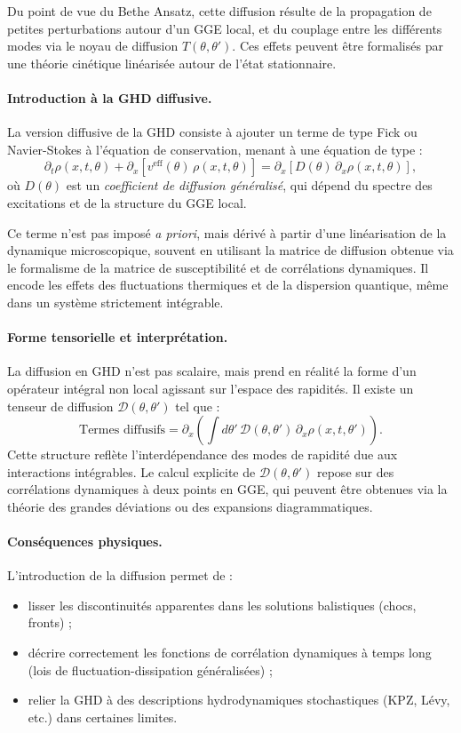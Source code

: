 Du point de vue du Bethe Ansatz, cette diffusion résulte de la propagation de petites perturbations autour d’un GGE local, et du couplage entre les différents modes via le noyau de diffusion $T(\theta,\theta')$. Ces effets peuvent être formalisés par une théorie cinétique linéarisée autour de l’état stationnaire.

\paragraph{Introduction à la GHD diffusive.}
La version diffusive de la GHD consiste à ajouter un terme de type Fick ou Navier-Stokes à l’équation de conservation, menant à une équation de type :
\[
\partial_t \rho(x,t,\theta) + \partial_x \left[ v^{\mathrm{eff}}(\theta)\, \rho(x,t,\theta) \right]
= \partial_x \left[ D(\theta)\, \partial_x \rho(x,t,\theta) \right],
\]
où $D(\theta)$ est un \emph{coefficient de diffusion généralisé}, qui dépend du spectre des excitations et de la structure du GGE local.

Ce terme n’est pas imposé \emph{a priori}, mais dérivé à partir d’une linéarisation de la dynamique microscopique, souvent en utilisant la matrice de diffusion obtenue via le formalisme de la matrice de susceptibilité et de corrélations dynamiques. Il encode les effets des fluctuations thermiques et de la dispersion quantique, même dans un système strictement intégrable.

\paragraph{Forme tensorielle et interprétation.}
La diffusion en GHD n’est pas scalaire, mais prend en réalité la forme d’un opérateur intégral non local agissant sur l’espace des rapidités. Il existe un tenseur de diffusion $\mathcal{D}(\theta,\theta')$ tel que :
\[
\text{Termes diffusifs} = \partial_x \left( \int d\theta'\, \mathcal{D}(\theta,\theta')\, \partial_x \rho(x,t,\theta') \right).
\]
Cette structure reflète l’interdépendance des modes de rapidité due aux interactions intégrables. Le calcul explicite de $\mathcal{D}(\theta,\theta')$ repose sur des corrélations dynamiques à deux points en GGE, qui peuvent être obtenues via la théorie des grandes déviations ou des expansions diagrammatiques.

\paragraph{Conséquences physiques.}
L’introduction de la diffusion permet de :
\begin{itemize}
    \item lisser les discontinuités apparentes dans les solutions balistiques (chocs, fronts) ;
    \item décrire correctement les fonctions de corrélation dynamiques à temps long (lois de fluctuation-dissipation généralisées) ;
    \item relier la GHD à des descriptions hydrodynamiques stochastiques (KPZ, Lévy, etc.) dans certaines limites.
\end{itemize}


